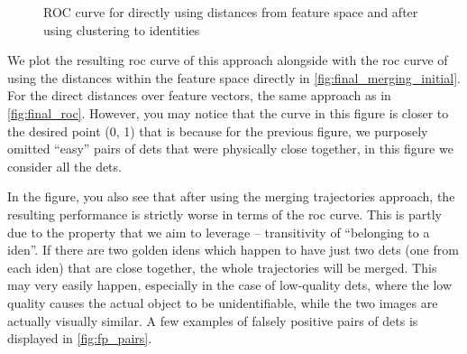 \begin{figure}
    \centering
    \def\svgwidth{\columnwidth}
    {}
    \caption{ROC curve for directly using distances from feature space and after using clustering to identities}
    \label{fig:final_merging_initial}
\end{figure}

We plot the resulting \gls{roc} curve of this approach alongside with the \gls{roc} curve of using the distances within the feature space directly in \autoref{fig:final_merging_initial}. For the direct distances over feature vectors, the same approach as in \autoref{fig:final_roc}. However, you may notice that the curve in this figure is closer to the desired point (0, 1) that is because for the previous figure, we purposely omitted ``easy'' pairs of \glspl{det} that were physically close together, in this figure we consider all the \glspl{det}.

In the figure, you also see that after using the merging trajectories approach, the resulting performance is strictly worse in terms of the \gls{roc} curve. This is partly due to the property that we aim to leverage -- transitivity of ``belonging to a \gls{iden}''. If there are two golden \glspl{iden} which happen to have just two \glspl{det} (one from each \gls{iden}) that are close together, the whole trajectories will be merged. This may very easily happen, especially in the case of low-quality \glspl{det}, where the low quality causes the actual object to be unidentifiable, while the two images are actually visually similar. A few examples of falsely positive pairs of \glspl{det} is displayed in \autoref{fig:fp_pairs}.


